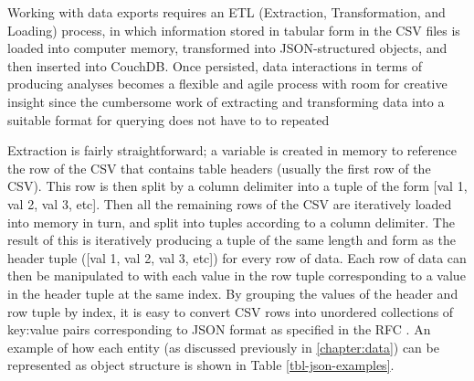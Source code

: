 Working with data exports requires an ETL (Extraction, Transformation, and Loading) process, in which information stored in tabular form in the CSV files is loaded into computer memory, transformed into JSON-structured objects, and then inserted into CouchDB. Once persisted, data interactions in terms of producing analyses becomes a flexible and agile process with room for creative insight since the cumbersome work of extracting and transforming data into a suitable format for querying does not have to to repeated

Extraction is fairly straightforward; a variable is created in memory to reference the row of the CSV that contains table headers (usually the first row of the CSV). This row is then split by a column delimiter into a tuple of the form [val 1, val 2, val 3, etc]. Then all the remaining rows of the CSV are iteratively loaded into memory in turn, and split into tuples according to a column delimiter. The result of this is iteratively producing a tuple of the same length and form as the header tuple ([val 1, val 2, val 3, etc]) for every row of data. Each row of data can then be manipulated to with each value in the row tuple corresponding to a value in the header tuple at the same index. By grouping the values of the header and row tuple by index, it is easy to convert CSV rows into unordered collections of key:value pairs corresponding to JSON format as specified in the RFC \cite{rfc7159}. An example of how each entity (as discussed previously in \autoref{chapter:data}) can be represented as object structure is shown in Table \ref{tbl-json-examples}.



